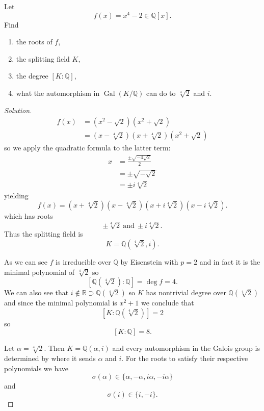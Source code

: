 \begin{prob}
    Let 
    \[
        f(x) = x^4 - 2 \in \mathbb Q[x].
    \]
    Find 
    \begin{enumerate}
        \item the roots of $f$, 
        \item the splitting field $K$, 
        \item the degree $[K:\mathbb Q]$, 
        \item what the automorphism in $\operatorname{Gal}(K/\mathbb 
            Q)$ can do to $\sqrt[4]2$ and $i$.
    \end{enumerate}
\end{prob}
\begin{proof}[Solution]
    \begin{align*}
        f(x) &= (x^2 - \sqrt 2)(x^2 + \sqrt 2) \\ 
             &= (x - \sqrt[4]2)(x + \sqrt[4]2)(x^2 + \sqrt 2)
    \end{align*}
    so we apply the quadratic formula to the latter term: 
    \begin{align*}
        x &= \frac{\pm \sqrt{-4\sqrt{2}}}{2} \\ 
          &= \pm \sqrt{-\sqrt{2}} \\ 
          &= \pm i \sqrt[4]{2}
    \end{align*}
    yielding 
    \[
        f(x) = (x + \sqrt[4]2)(x - \sqrt[4]2)(x + i\sqrt[4]2)
        (x - i\sqrt[4]2).
    \]
    which has roots 
    \[
        \pm \sqrt[4]2 \ \text{and} \ 
        \pm i \sqrt[4]2. 
    \]
    Thus the splitting field is 
    \[
        K = \mathbb Q(\sqrt[4]2, i).
    \]

    As we can see $f$ is irreducible over $\mathbb Q$ by 
    Eisenstein with $p = 2$ and in fact it is the minimal 
    polynomial of $\sqrt[4]2$ so 
    \[
        [\mathbb Q(\sqrt[4]2) : \mathbb Q] = \deg f = 4.  
    \]
    We can also see that $i \not \in \mathbb R \supset 
    \mathbb Q(\sqrt[4] 2)$ so $K$ has nontrivial degree over 
    $\mathbb Q(\sqrt[4] 2)$ and since the minimal polynomial is 
    $x^2 + 1$ we conclude that 
    \[
        [K : \mathbb Q(\sqrt[4]2)] = 2
    \]
    so 
    \[
        [K : \mathbb Q] = 8.
    \]

    Let $\alpha = \sqrt[4]2$. Then $K = \mathbb Q(\alpha, i)$ and 
    every automorphism in the Galois group is determined by 
    where it sends $\alpha$ and $i$.
    For the roots to satisfy their respective polynomials we have 
    \[
        \sigma(\alpha) \in \{\alpha, -\alpha, i\alpha, -i\alpha\}
    \]
    and 
    \[
        \sigma(i) \in \{i,-i\}.
    \]
\end{proof}

